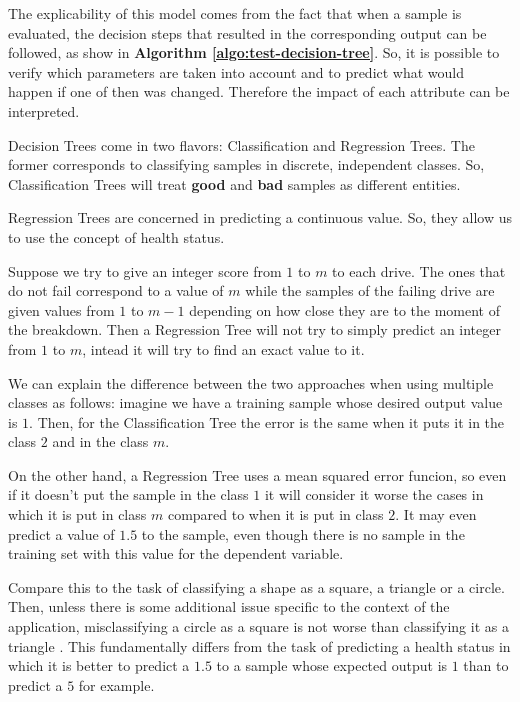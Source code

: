 The explicability of this model comes from the fact that when a sample is evaluated, the decision steps that resulted in the corresponding output can be followed, as show in \textbf{Algorithm \ref{algo:test-decision-tree}}.
So, it is possible to verify which parameters are taken into account and to predict what would happen if one of then was changed.
Therefore the impact of each attribute can be interpreted.

Decision Trees come in two flavors: Classification and Regression Trees.
The former corresponds to classifying samples in discrete, independent classes.
So, Classification Trees will treat \textbf{good} and \textbf{bad} samples as different entities.

Regression Trees are concerned in predicting a continuous value.
So, they allow us to use the concept of health status.

Suppose we try to give an integer score from $1$ to $m$ to each drive.
The ones that do not fail correspond to a value of $m$ while the samples of the failing drive are given values from $1$ to $m-1$ depending on how close they are to the moment of the breakdown.
Then a Regression Tree will not try to simply predict an integer from $1$ to $m$, intead it will try to find an exact value to it.

We can explain the difference between the two approaches when using multiple classes as follows: imagine we have a training sample whose desired output value is $1$.
Then, for the Classification Tree the error is the same when it puts it in the class $2$ and in the class $m$.

On the other hand, a Regression Tree uses a mean squared error funcion, so even if it doesn't put the sample in the class $1$ it will consider it worse the cases in which it is put in class $m$ compared to when it is put in class $2$.
It may even predict a value of $1.5$ to the sample, even though there is no sample in the training set with this value for the dependent variable.

Compare this to the task of classifying a shape as a square, a triangle or a circle.
Then, unless there is some additional issue specific to the context of the application, misclassifying a circle as a square is not worse than classifying it as a triangle
.
This fundamentally differs from the task of predicting a health status in which it is better to predict a $1.5$ to a sample whose expected output is $1$ than to predict a $5$ for example.


